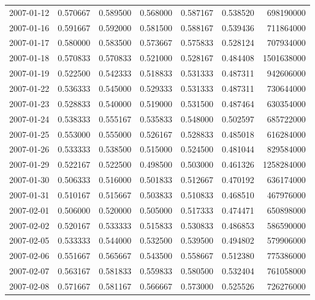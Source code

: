 \begin{tabular}{lrrrrrr}
2007-01-12 &    0.570667 &    0.589500 &    0.568000 &    0.587167 &    0.538520 &   698190000 \\
2007-01-16 &    0.591667 &    0.592000 &    0.581500 &    0.588167 &    0.539436 &   711864000 \\
2007-01-17 &    0.580000 &    0.583500 &    0.573667 &    0.575833 &    0.528124 &   707934000 \\
2007-01-18 &    0.570833 &    0.570833 &    0.521000 &    0.528167 &    0.484408 &  1501638000 \\
2007-01-19 &    0.522500 &    0.542333 &    0.518833 &    0.531333 &    0.487311 &   942606000 \\
2007-01-22 &    0.536333 &    0.545000 &    0.529333 &    0.531333 &    0.487311 &   730644000 \\
2007-01-23 &    0.528833 &    0.540000 &    0.519000 &    0.531500 &    0.487464 &   630354000 \\
2007-01-24 &    0.538333 &    0.555167 &    0.535833 &    0.548000 &    0.502597 &   685722000 \\
2007-01-25 &    0.553000 &    0.555000 &    0.526167 &    0.528833 &    0.485018 &   616284000 \\
2007-01-26 &    0.533333 &    0.538500 &    0.515000 &    0.524500 &    0.481044 &   829584000 \\
2007-01-29 &    0.522167 &    0.522500 &    0.498500 &    0.503000 &    0.461326 &  1258284000 \\
2007-01-30 &    0.506333 &    0.516000 &    0.501833 &    0.512667 &    0.470192 &   636174000 \\
2007-01-31 &    0.510167 &    0.515667 &    0.503833 &    0.510833 &    0.468510 &   467976000 \\
2007-02-01 &    0.506000 &    0.520000 &    0.505000 &    0.517333 &    0.474471 &   650898000 \\
2007-02-02 &    0.520167 &    0.533333 &    0.515833 &    0.530833 &    0.486853 &   586590000 \\
2007-02-05 &    0.533333 &    0.544000 &    0.532500 &    0.539500 &    0.494802 &   579906000 \\
2007-02-06 &    0.551667 &    0.565667 &    0.543500 &    0.558667 &    0.512380 &   775386000 \\
2007-02-07 &    0.563167 &    0.581833 &    0.559833 &    0.580500 &    0.532404 &   761058000 \\
2007-02-08 &    0.571667 &    0.581167 &    0.566667 &    0.573000 &    0.525526 &   726276000 \\

\end{tabular}
